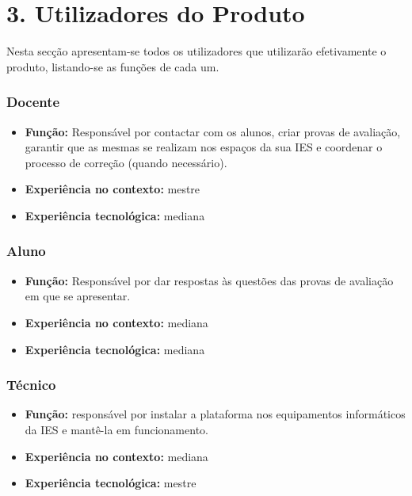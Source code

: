 \chapter*{3. Utilizadores do Produto}

{\TextoCor
Nesta secção apresentam-se todos os utilizadores que utilizarão efetivamente o produto, listando-se as funções de cada um.
}
\subsection*{Docente}
{\TextoCor
\begin{itemize}
    \item \textbf{Função:} Responsável por contactar com os alunos, criar provas de avaliação, garantir que as mesmas se realizam nos espaços da sua IES e coordenar o processo de correção (quando necessário).
    \item \textbf{Experiência no contexto:} mestre
    \item \textbf{Experiência tecnológica:} mediana
\end{itemize}
}

\subsection*{Aluno}
{\TextoCor
\begin{itemize}
    \item \textbf{Função:} Responsável por dar respostas às questões das provas de avaliação em que se apresentar.
    \item \textbf{Experiência no contexto:} mediana
    \item \textbf{Experiência tecnológica:} mediana
\end{itemize}
}

\subsection*{Técnico}
{\TextoCor
\begin{itemize}
    \item \textbf{Função:} responsável por instalar a plataforma nos equipamentos informáticos da IES e mantê-la em funcionamento.
    \item \textbf{Experiência no contexto:} mediana
    \item \textbf{Experiência tecnológica:} mestre
\end{itemize}
}

